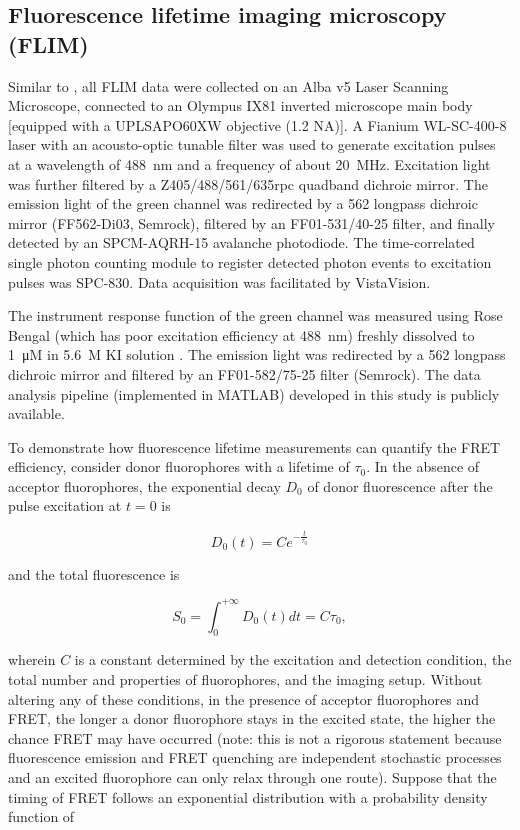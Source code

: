 \subsection{Fluorescence lifetime imaging microscopy (FLIM)}
\label{FLIMMethod}

Similar to , all FLIM data were collected on an Alba v5 Laser Scanning Microscope, connected to an Olympus IX81 inverted microscope main body [equipped with a UPLSAPO60XW objective (1.2 NA)]. A Fianium WL-SC-400-8 laser with an acousto-optic tunable filter was used to generate excitation pulses at a wavelength of \SI{488}{nm} and a frequency of about \SI{20}{MHz}. Excitation light was further filtered by a Z405/488/561/635rpc quadband dichroic mirror. The emission light of the green channel was redirected by a 562 longpass dichroic mirror (FF562-Di03, Semrock), filtered by an FF01-531/40-25 filter, and finally detected by an SPCM-AQRH-15 avalanche photodiode. The time-correlated single photon counting module to register detected photon events to excitation pulses was SPC-830. Data acquisition was facilitated by VistaVision.

The instrument response function of the green channel was measured using Rose Bengal (which has poor excitation efficiency at \SI{488}{nm}) freshly dissolved to \SI{1}{\micro M} in \SI{5.6}{M} KI solution \cite{RoseBengal}. The emission light was redirected by a 562 longpass dichroic mirror and filtered by an FF01-582/75-25 filter (Semrock). The data analysis pipeline (implemented in MATLAB) developed in this study is publicly available.

To demonstrate how fluorescence lifetime measurements can quantify the FRET efficiency, consider donor fluorophores with a lifetime of $\tau_0$. In the absence of acceptor fluorophores, the exponential decay $D_0$ of donor fluorescence after the pulse excitation at $t = 0$ is

\begin{equation*}
    D_0(t) = C e^{-\frac{t}{\tau_0}}
\end{equation*}

\noindent and the total fluorescence is

\begin{equation*}
    S_0 = \int_0^{+\infty}D_0(t) dt = C\tau_0,
\end{equation*}

\noindent wherein $C$ is a constant determined by the excitation and detection condition, the total number and properties of fluorophores, and the imaging setup. Without altering any of these conditions, in the presence of acceptor fluorophores and FRET, the longer a donor fluorophore stays in the excited state, the higher the chance FRET may have occurred (note: this is not a rigorous statement because fluorescence emission and FRET quenching are independent stochastic processes and an excited fluorophore can only relax through one route). Suppose that the timing of FRET follows an exponential distribution with a probability density function of


